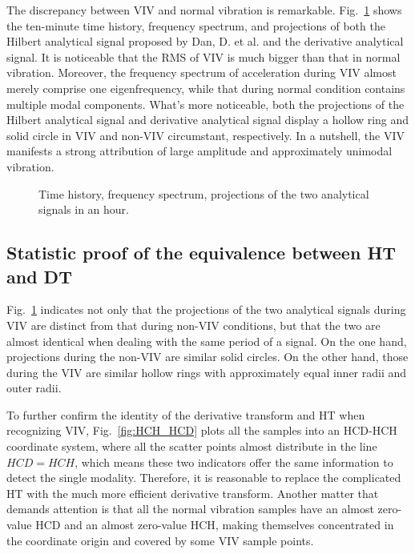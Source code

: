 \documentclass[preprint, 3p, times, compress, 11pt]{elsarticle}
\begin{document}
The discrepancy between VIV and normal vibration is remarkable. 
Fig.~\ref{fig:time_freq_hilb_deri} shows the ten-minute time history, 
frequency spectrum, and projections of both the Hilbert analytical signal 
proposed by Dan, D. et al. \cite{dan2022monitoring} and the 
derivative analytical signal. It is noticeable that the RMS of VIV is 
much bigger than that in normal vibration. Moreover, the frequency 
spectrum of acceleration during VIV almost merely comprise one 
eigenfrequency, while that during normal condition contains multiple 
modal components. What's more noticeable, both the projections of the 
Hilbert analytical signal and derivative analytical signal display a 
hollow ring and solid circle in VIV and non-VIV circumstant, 
respectively. In a nutshell, the VIV manifests a strong attribution 
of large amplitude and approximately unimodal vibration.

\begin{figure}[ht]
    \centering
    \qquad
    \caption{Time history, frequency spectrum, projections of the two 
            analytical signals in an hour.}
    \label{fig:time_freq_hilb_deri}
\end{figure}

\subsection{Statistic proof of the equivalence between HT and DT} 

Fig.~\ref{fig:time_freq_hilb_deri} indicates not only that the 
projections of the two analytical signals during VIV are distinct from 
that during non-VIV conditions, but that the two are almost identical 
when dealing with the same period of a signal. On the one hand, 
projections during the non-VIV are similar solid circles. On the other 
hand, those during the VIV are similar hollow rings with approximately 
equal inner radii and outer radii.

To further confirm the identity of the derivative transform and HT when 
recognizing VIV, Fig.~\ref{fig:HCH_HCD} plots all the samples into an 
HCD-HCH coordinate system, where all the scatter points almost distribute 
in the line $HCD = HCH$, which means these two indicators offer 
the same information to detect the single modality. 
Therefore, it is reasonable to replace 
the complicated HT with the much more efficient derivative transform. 
Another matter that demands attention is that all the normal vibration 
samples have an almost zero-value HCD and an almost zero-value HCH, 
making themselves concentrated in the coordinate origin and covered by 
some VIV sample points.
\end{document}
